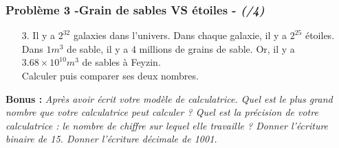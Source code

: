 \documentclass[11pt]{article}
\begin{document}
\subsubsection*{Problème 3 -Grain de sables VS étoiles  - \textit{(/4)}}
\begin{enumerate}
\item[3.] Il y a $2^{32}$ galaxies dans l'univers. Dans chaque galaxie, il y a $2^{25}$ étoiles.\\
Dans $1m^3$ de sable, il y a 4 millions de grains de sable. Or, il y a $3.68 \times 10 ^{10} m^3$ de sables à Feyzin.\\
Calculer puis comparer ses deux nombres.

\end{enumerate}

\textbf{Bonus : } \textit{Après avoir écrit votre modèle de calculatrice. Quel est le plus grand nombre que votre calculatrice peut calculer ? Quel est la précision de votre calculatrice : le nombre de chiffre sur lequel elle travaille ? Donner l'écriture binaire de 15. Donner l'écriture décimale de 1001.}
\end{document}
